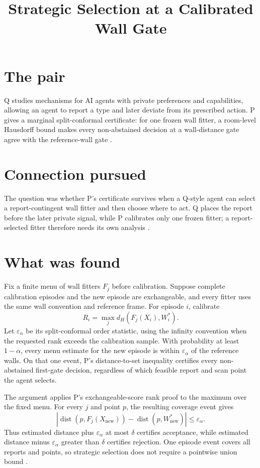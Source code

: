 \documentclass{article}
\title{Strategic Selection at a Calibrated Wall Gate}
\begin{document}
\maketitle

\section{The pair}

Q studies mechanisms for AI agents with private preferences and capabilities, allowing an agent to report a type and later deviate from its prescribed action. P gives a marginal split-conformal certificate: for one frozen wall fitter, a room-level Hausdorff bound makes every non-abstained decision at a wall-distance gate agree with the reference-wall gate .

\section{Connection pursued}

The question was whether P's certificate survives when a Q-style agent can select a report-contingent wall fitter and then choose where to act. Q places the report before the later private signal, while P calibrates only one frozen fitter; a report-selected fitter therefore needs its own analysis .

\section{What was found}

\begin{claim}
Fix a finite menu of wall fitters \(F_j\) before calibration. Suppose complete calibration episodes and the new episode are exchangeable, and every fitter uses the same wall convention and reference frame. For episode \(i\), calibrate
\[
R_i=\max_j d_H(F_j(X_i),W_i^*).
\]
Let \(\varepsilon_\alpha\) be its split-conformal order statistic, using the infinity convention when the requested rank exceeds the calibration sample. With probability at least \(1-\alpha\), every menu estimate for the new episode is within \(\varepsilon_\alpha\) of the reference walls. On that one event, P's distance-to-set inequality certifies every non-abstained first-gate decision, regardless of which feasible report and scan point the agent selects.
\end{claim}

The argument applies P's exchangeable-score rank proof to the maximum over the fixed menu. For every \(j\) and point \(p\), the resulting coverage event gives
\[
\left|\operatorname{dist}(p,F_j(X_{\mathrm{new}}))
-\operatorname{dist}(p,W_{\mathrm{new}}^*)\right|
\leq\varepsilon_\alpha.
\]
Thus estimated distance plus \(\varepsilon_\alpha\) at most \(\delta\) certifies acceptance, while estimated distance minus \(\varepsilon_\alpha\) greater than \(\delta\) certifies rejection. One episode event covers all reports and points, so strategic selection does not require a pointwise union bound .
\end{document}
